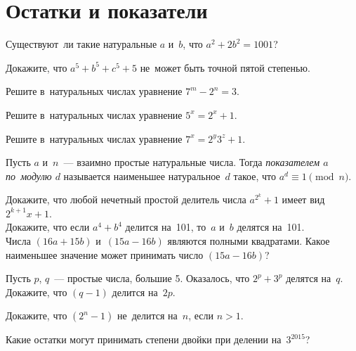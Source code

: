 
\section*{Остатки и показатели}


\begin{problems}

\item
Существуют~ли такие натуральные $a$ и~$b$, что $a^2 + 2 b^2 = 1001$?

\item
Докажите, что $a^5 + b^5 + c^5 + 5$ не~может быть точной пятой степенью.

\item
Решите в~натуральных числах уравнение $7^m - 2^n = 3$.

\item
Решите в~натуральных числах уравнение $5^x = 2^x + 1$.

\item
Решите в~натуральных числах уравнение $7^x = 2^y 3^z + 1$.

\end{problems}

Пусть $a$ и~$n$~--- взаимно простые натуральные числа.
Тогда \emph{показателем $a$ по~модулю $d$} называется наименьшее
натуральное~$d$ такое, что $a^d \equiv 1 \pmod{n}$.

\begin{problems}

\item
\sp
Докажите, что любой нечетный простой делитель числа $a^{2^k} + 1$ имеет вид
$2^{k+1} x + 1$.
\\
\sp
Докажите, что если $a^4 + b^4$ делится на~101, то~$a$ и~$b$ делятся на~101.
\\
\sp
Числа $(16 a + 15 b)$ и~$(15 a - 16 b)$ являются полными квадратами.
Какое наименьшее значение может принимать число $(15 a - 16 b)$?

\item
Пусть $p$, $q$~--- простые числа, большие 5.
Оказалось, что $2^p + 3^p$ делятся на~$q$.
Докажите, что $(q - 1)$ делится на~$2 p$.

\item
Докажите, что $(2^n - 1)$ не~делится на~$n$, если $n > 1$.

\item
Какие остатки могут принимать степени двойки при делении на~$3^{2015}$?

\end{problems}

